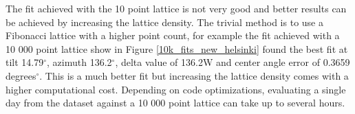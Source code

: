 \begin{figure}[h]
\begin{floatrow}
\end{floatrow}
\end{figure}

\noindent The fit achieved with the 10 point lattice is not very good and better results can be achieved by increasing the lattice density. The trivial method is to use a Fibonacci lattice with a higher point count, for example the fit achieved with a 10 000 point lattice show in Figure \ref{10k_fits_new_helsinki} found the best fit at tilt 14.79$^\circ$, azimuth 136.2$^\circ$, delta value of 136.2W and center angle error of 0.3659 degrees$^\circ$. This is a much better fit but increasing the lattice density comes with a higher computational cost. Depending on code optimizations, evaluating a single day from the dataset against a 10 000 point lattice can take up to several hours.

